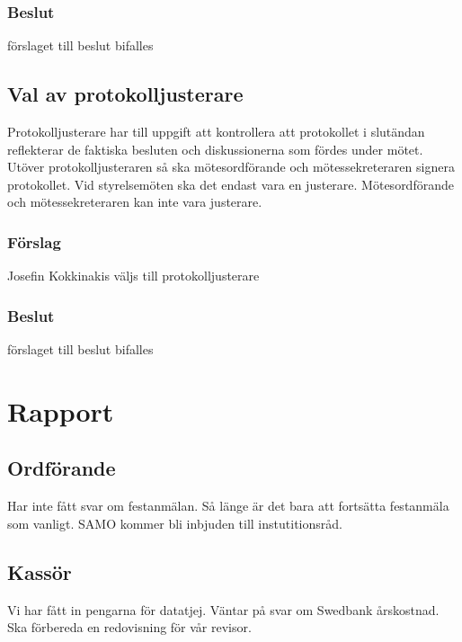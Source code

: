 \documentclass[protokoll]{dvd}
\begin{document}
\subsubsection*{Beslut}
\begin{attsatser}
    \item förslaget till beslut bifalles
\end{attsatser}

\subsection{Val av protokolljusterare}

Protokolljusterare har till uppgift att kontrollera att protokollet i slutändan reflekterar de faktiska besluten och diskussionerna som fördes under mötet.
Utöver protokolljusteraren så ska mötesordförande och mötessekreteraren signera protokollet.
Vid styrelsemöten ska det endast vara en justerare.
Mötesordförande och mötessekreteraren kan inte vara justerare.

\subsubsection*{Förslag}
\begin{attsatser}
    \item Josefin Kokkinakis väljs till protokolljusterare
\end{attsatser}
\subsubsection*{Beslut}
\begin{attsatser}
    \item förslaget till beslut bifalles
\end{attsatser}

\section{Rapport} 
\subsection{Ordförande}
Har inte fått svar om festanmälan. Så länge är det bara att fortsätta festanmäla som vanligt.
SAMO kommer bli inbjuden till instutitionsråd.

\subsection{Kassör}
Vi har fått in pengarna för datatjej. Väntar på svar om Swedbank årskostnad.
Ska förbereda en redovisning för vår revisor.
\end{document}
